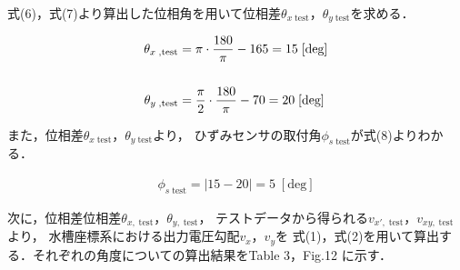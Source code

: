 式(6)，式(7)より算出した位相角を用いて位相差$\theta_{x \;\mathrm{test}}$，$\theta_{y \;\mathrm{test}}$を求める．

\begin{align}
  \theta_{x\;,\mathrm{test}} & = \pi \cdot \frac{180}{\pi} - 165 = 15\;\mathrm{[deg]}          \\
  \notag                                                                                       \\
  \theta_{y\;,\mathrm{test}} & = \frac{\pi}{2} \cdot \frac{180}{\pi} - 70 = 20\;\mathrm{[deg]}
\end{align}

\newpage
また，位相差$\theta_{x \;\mathrm{test}}$，$\theta_{y \;\mathrm{test}}$より，
ひずみセンサの取付角$\phi_{s\;\mathrm{test}}$が式(8)よりわかる．

\begin{align}
  \phi_{s\;\mathrm{test}} = \left|15 - 20\right| = 5 \;[\mathrm{deg} ]
\end{align}

次に，位相差位相差$\theta_{x,\;\mathrm{test}}$，$\theta_{y,\;\mathrm{test}}$，
テストデータから得られる$v_{x',\;\mathrm{test}}$，$v_{xy,\;\mathrm{test}}$より，
水槽座標系における出力電圧勾配$v_x$，$v_y$を
式(1)，式(2)を用いて算出する．それぞれの角度についての算出結果をTable 3，Fig.12 に示す．


